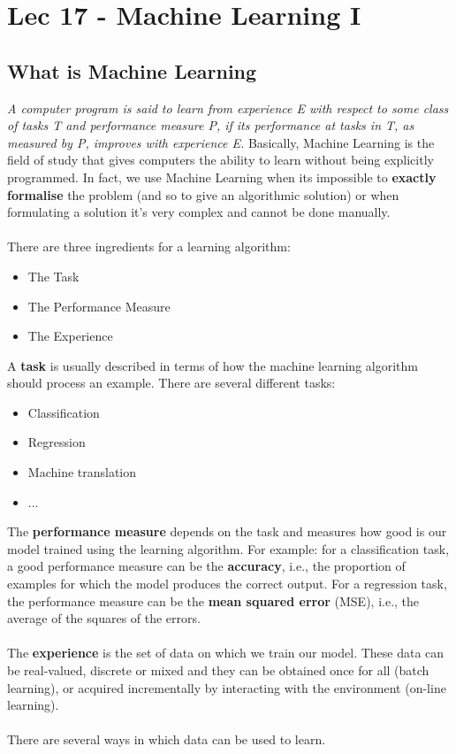 \chapter{Lec 17 - Machine Learning I}
\section{What is Machine Learning}
\textit{A computer program is said to learn from experience E with respect to some class of tasks T and performance measure P, if its performance at tasks in T, as measured by P, improves with experience E.} Basically, Machine Learning is the field of study that gives computers the ability to learn without being explicitly programmed. In fact, we use Machine Learning when its impossible to \textbf{exactly formalise} the problem (and so to give an algorithmic solution) or when formulating a solution it's very complex and cannot be done manually.\\\\
There are three ingredients for a learning algorithm:
\begin{itemize}
    \item The Task
    \item The Performance Measure
    \item The Experience
\end{itemize}
A \textbf{task} is usually described in terms of how the machine learning algorithm should process an example. There are several different tasks:
\begin{itemize}
    \item Classification
    \item Regression
    \item Machine translation
    \item ...
\end{itemize}
The \textbf{performance measure} depends on the task and measures how good is our model trained using the learning algorithm. For example: for a classification task, a good performance measure can be the \textbf{accuracy}, i.e.,  the proportion of examples for which the model produces the correct output. For a regression task, the performance measure can be the \textbf{mean squared error} (MSE), i.e.,  the average of the squares of the errors.\\\\
The \textbf{experience} is the set of data on which we train our model. These data can be real-valued, discrete or mixed and they can be obtained once for all (batch learning), or acquired incrementally by interacting with the environment (on-line learning).\\\\
There are several ways in which data can be used to learn.

